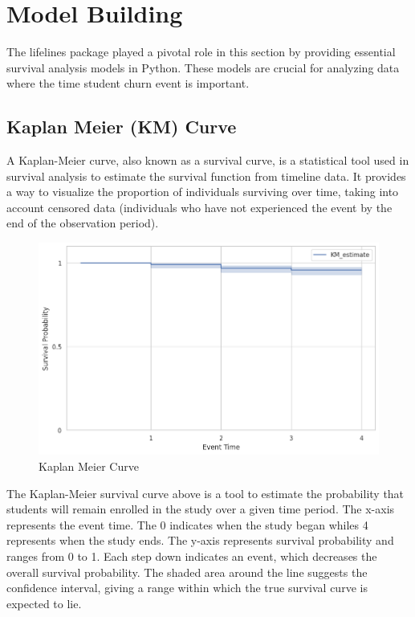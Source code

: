 \documentclass[doublespacing]{report} %
\begin{document}
\section{Model Building}

The lifelines package played a pivotal role in this section by providing essential survival analysis models in Python. These models are crucial for analyzing data where the time student churn event is important. 


\subsection{Kaplan Meier (KM) Curve}

A Kaplan-Meier curve, also known as a survival curve, is a statistical tool used in survival analysis to estimate the survival function from timeline data. It provides a way to visualize the proportion of individuals surviving over time, taking into account censored data (individuals who have not experienced the event by the end of the observation period).
\begin{figure}[H]
    \centering
    \includegraphics[width=1\linewidth]{Figure 4/4.1.png}
    \caption{Kaplan Meier Curve}
\end{figure}

The Kaplan-Meier survival curve above is a tool to estimate the probability that students will remain enrolled in the study over a given time period. The x-axis represents the event time. The 0 indicates when the study began whiles 4 represents when the study ends. The y-axis represents survival probability and ranges from 0 to 1. Each step down indicates an event, which decreases the overall survival probability.  The shaded area around the line suggests the confidence interval, giving a range within which the true survival curve is expected to lie.
\end{document}
